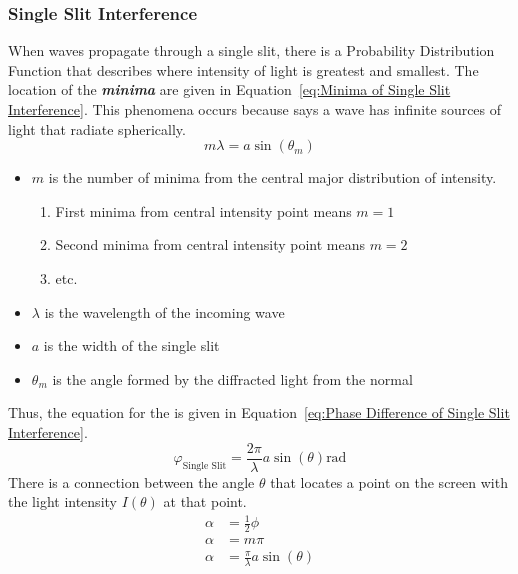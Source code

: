 \subsubsection{Single Slit Interference}\label{subsubsec:Single Slit Interference}
\begin{definition}\label{def:Single Slit Interference}
  When waves propagate through a single slit, there is a Probability Distribution Function that describes where intensity of light is greatest and smallest.
  The location of the \emph{\textbf{minima}} are given in Equation~\eqref{eq:Minima of Single Slit Interference}.
  This phenomena occurs because  says a wave has infinite sources of light that radiate spherically.
  \begin{equation}\label{eq:Minima of Single Slit Interference}
    m \lambda = a \sin \left( \theta_{m} \right)
  \end{equation}
  \begin{itemize}
  \item $m$ is the number of minima from the central major distribution of intensity.
    \begin{enumerate}
    \item First minima from central intensity point means $m=1$
    \item Second minima from central intensity point means $m=2$
    \item etc.
    \end{enumerate}
  \item $\lambda$ is the wavelength of the incoming wave
  \item $a$ is the width of the single slit
  \item $\theta_{m}$ is the angle formed by the diffracted light from the normal
  \end{itemize}
  Thus, the equation for the  is given in Equation~\eqref{eq:Phase Difference of Single Slit Interference}.
  \begin{equation}\label{eq:Phase Difference of Single Slit Interference}
    \varphi_{\text{Single Slit}} = \frac{2 \pi}{\lambda} a \sin \left( \theta \right) \si{\radian}
  \end{equation}
  There is a connection between the angle $\theta$ that locates a point on the screen with the light intensity $I\left( \theta \right)$ at that point.
  \begin{equation}\label{eq:Alpha for Single Slit Interference}
    \begin{aligned}
      \alpha &= \frac{1}{2} \phi \\
      \alpha &= m \pi \\
      \alpha &= \frac{\pi}{\lambda} a\sin \left( \theta \right) \\
    \end{aligned}
  \end{equation}
\end{definition}

